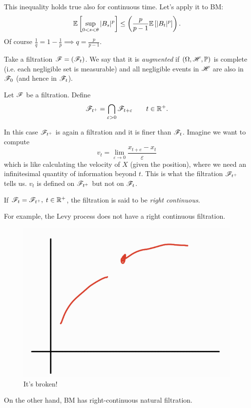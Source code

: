 \documentclass[12pt]{report}
\begin{document}
This inequality holds true also for continuous time. Let's apply it to BM:
\begin{equation*}
	\mathbb{E}\left[\sup_{0<s<\theta}|B_{s}|^{p}\right]\leq\left(\frac{p}{p-1}\mathbb{E}\left[|B_{t}|^{p}\right]\right).
\end{equation*}
Of course $\frac{1}{q}=1-\frac{1}{p}\implies q=\frac{p}{p-1}$.
\begin{definition}
	Take a filtration $\mathscr{F}=(\mathscr{F}_{t})$. We say that it is \emph{augmented} if $(\Omega,\mathscr{H},\mathbb{P})$ is complete (i.e. each negligible set is measurable) and all negligible events in $\mathscr{H}$ are also in $\mathscr{F}_{0}$ (and hence in $\mathscr{F}_{t}$).
\end{definition}
\begin{definition}
	Let $\mathscr{F}$ be a filtration. Define
	\begin{equation*}
		\mathscr{F}_{t^{+}}=\bigcap_{\varepsilon>0}\mathscr{F}_{t+\varepsilon}\qquad t\in\mathbb{R}^{+}.
	\end{equation*}
\end{definition}
In this case $\mathscr{F}_{t^{+}}$ is again a filtration and it is finer than $\mathscr{F}_{t}$. Imagine we want to compute
\begin{equation*}
	v_{t}=\lim_{\varepsilon\to0}\frac{x_{t+e}-x_{t}}{\varepsilon}
\end{equation*}
which is like calculating the velocity of $X$ (given the position), where we need an infinitesimal quantity of information beyond $t$. This is what the filtration $\mathscr{F}_{t^{+}}$ tells us. $v_{t}$ is defined on $\mathscr{F}_{t^{+}}$ but not on $\mathscr{F}_{t}$.
\begin{definition}
	If $\mathscr{F}_{t}=\mathscr{F}_{t^{+}},\; t\in\mathbb{R}^{+}$, the filtration is said to be \emph{right continuous}.
\end{definition}
For example, the Levy process does not have a right continuous filtration.
\begin{figure}[H]
	\centering
	\includegraphics[width=0.5\linewidth]{img/screenshot015}
	\caption{It's broken!}
	\label{fig:screenshot015}
\end{figure}
On the other hand, BM has right-continuous natural filtration.\par
\end{document}
